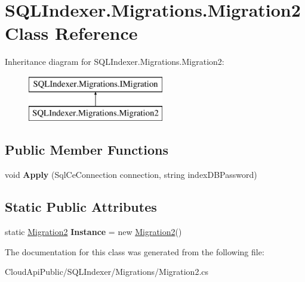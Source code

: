 \hypertarget{class_s_q_l_indexer_1_1_migrations_1_1_migration2}{\section{S\-Q\-L\-Indexer.\-Migrations.\-Migration2 Class Reference}
\label{class_s_q_l_indexer_1_1_migrations_1_1_migration2}
}
Inheritance diagram for S\-Q\-L\-Indexer.\-Migrations.\-Migration2\-:\begin{figure}[H]
\begin{center}
\leavevmode
\includegraphics[height=2.000000cm]{class_s_q_l_indexer_1_1_migrations_1_1_migration2}
\end{center}
\end{figure}
\subsection*{Public Member Functions}
\begin{DoxyCompactItemize}
\item 
\hypertarget{class_s_q_l_indexer_1_1_migrations_1_1_migration2_a14ac1e3c6434f8b1b4f3029857b62314}{void {\bfseries Apply} (Sql\-Ce\-Connection connection, string index\-D\-B\-Password)}\label{class_s_q_l_indexer_1_1_migrations_1_1_migration2_a14ac1e3c6434f8b1b4f3029857b62314}

\end{DoxyCompactItemize}
\subsection*{Static Public Attributes}
\begin{DoxyCompactItemize}
\item 
\hypertarget{class_s_q_l_indexer_1_1_migrations_1_1_migration2_a0d903afef182a106402cb9b0b0419d6a}{static \hyperlink{class_s_q_l_indexer_1_1_migrations_1_1_migration2}{Migration2} {\bfseries Instance} = new \hyperlink{class_s_q_l_indexer_1_1_migrations_1_1_migration2}{Migration2}()}\label{class_s_q_l_indexer_1_1_migrations_1_1_migration2_a0d903afef182a106402cb9b0b0419d6a}

\end{DoxyCompactItemize}


The documentation for this class was generated from the following file\-:\begin{DoxyCompactItemize}
\item 
Cloud\-Api\-Public/\-S\-Q\-L\-Indexer/\-Migrations/Migration2.\-cs\end{DoxyCompactItemize}
